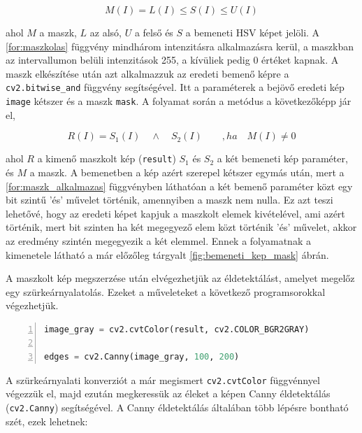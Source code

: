 \begin{equation}
    M(I) = L(I) \le S(I) \le U(I)
    \label{for:maszkolas}
\end{equation}

\par ahol $M$ a maszk, $L$ az alsó, $U$ a felső és $S$ a bemeneti HSV képet jelöli. A \ref{for:maszkolas} függvény mindhárom intenzitásra alkalmazásra kerül, a maszkban az intervallumon belüli intenzitások 255, a kívüliek pedig 0 értéket kapnak. A maszk elkészítése után azt alkalmazzuk az eredeti bemenő képre a \lstinline{cv2.bitwise_and} függvény \cite{cv2_bitwise_and} segítségével. Itt a paraméterek a bejövő eredeti kép \lstinline{image} kétszer és a maszk \lstinline{mask}.
\newline A folyamat során a metódus a következőképp jár el,

\begin{equation}
    R(I) = S_1(I)\quad \land\quad S_2(I)\qquad ,ha\quad M(I) \ne 0
    \label{for:maszk_alkalmazas}
\end{equation}

\par ahol $R$ a kimenő maszkolt kép (\lstinline{result}) $S_1$ és $S_2$ a két bemeneti kép paraméter, és $M$ a maszk. A bemenetben a kép azért szerepel kétszer egymás után, mert a \ref{for:maszk_alkalmazas} függvényben láthatóan a két bemenő paraméter közt egy bit szintű 'és' művelet történik, amennyiben a maszk nem nulla. Ez azt teszi lehetővé, hogy az eredeti képet kapjuk a maszkolt elemek kivételével, ami azért történik, mert bit szinten ha két megegyező elem közt történik 'és' művelet, akkor az eredmény szintén megegyezik a két elemmel. Ennek a folyamatnak a kimenetele látható a már előzőleg tárgyalt \ref{fig:bemeneti_kep_mask} ábrán.
\par A maszkolt kép megszerzése után elvégezhetjük az éldetektálást, amelyet megelőz egy szürkeárnyalatolás.
\newline Ezeket a műveleteket a következő programsorokkal végezhetjük.

\vspace{2mm}\begin{lstlisting}[language=Python, numbers=left]
image_gray = cv2.cvtColor(result, cv2.COLOR_BGR2GRAY)

edges = cv2.Canny(image_gray, 100, 200)
\end{lstlisting}

\par A szürkeárnyalati konverziót a már megismert \lstinline{cv2.cvtColor} függvénnyel \cite{cv2_cvt_color} végezzük el, majd ezután megkeressük az éleket a képen Canny éldetektálás \cite{cv2_canny,canny_edge_detection} (\lstinline{cv2.Canny}) segítségével.
\newline A Canny éldetektálás általában több lépésre bontható szét, ezek lehetnek:

